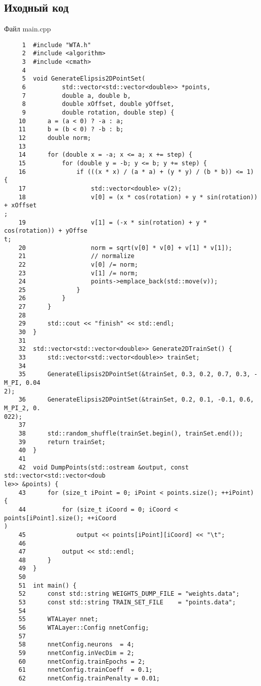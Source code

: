 \subsection{Иходный код}
Файл main.cpp
\begin{verbatim}
     1	#include "WTA.h"
     2	#include <algorithm>
     3	#include <cmath>
     4	
     5	void GenerateElipsis2DPointSet(
     6	        std::vector<std::vector<double>> *points,
     7	        double a, double b,
     8	        double xOffset, double yOffset,
     9	        double rotation, double step) {
    10	    a = (a < 0) ? -a : a;
    11	    b = (b < 0) ? -b : b;
    12	    double norm;
    13	
    14	    for (double x = -a; x <= a; x += step) {
    15	        for (double y = -b; y <= b; y += step) {
    16	            if (((x * x) / (a * a) + (y * y) / (b * b)) <= 1) {
    17	                std::vector<double> v(2);
    18	                v[0] = (x * cos(rotation) + y * sin(rotation)) + xOffset
;
    19	                v[1] = (-x * sin(rotation) + y * cos(rotation)) + yOffse
t;
    20	                norm = sqrt(v[0] * v[0] + v[1] * v[1]);
    21	                // normalize
    22	                v[0] /= norm;
    23	                v[1] /= norm;
    24	                points->emplace_back(std::move(v));
    25	            }
    26	        }
    27	    }
    28	
    29	    std::cout << "finish" << std::endl;
    30	}
    31	
    32	std::vector<std::vector<double>> Generate2DTrainSet() {
    33	    std::vector<std::vector<double>> trainSet;
    34	
    35	    GenerateElipsis2DPointSet(&trainSet, 0.3, 0.2, 0.7, 0.3, -M_PI, 0.04
2);
    36	    GenerateElipsis2DPointSet(&trainSet, 0.2, 0.1, -0.1, 0.6, M_PI_2, 0.
022);
    37	
    38	    std::random_shuffle(trainSet.begin(), trainSet.end());
    39	    return trainSet;
    40	}
    41	
    42	void DumpPoints(std::ostream &output, const std::vector<std::vector<doub
le>> &points) {
    43	    for (size_t iPoint = 0; iPoint < points.size(); ++iPoint) {
    44	        for (size_t iCoord = 0; iCoord < points[iPoint].size(); ++iCoord
)
    45	            output << points[iPoint][iCoord] << "\t";
    46	
    47	        output << std::endl;
    48	    }
    49	}
    50	
    51	int main() {
    52	    const std::string WEIGHTS_DUMP_FILE = "weights.data";
    53	    const std::string TRAIN_SET_FILE    = "points.data";
    54	    
    55	    WTALayer nnet;
    56	    WTALayer::Config nnetConfig;
    57	
    58	    nnetConfig.neurons  = 4;
    59	    nnetConfig.inVecDim = 2;
    60	    nnetConfig.trainEpochs = 2;
    61	    nnetConfig.trainCoeff  = 0.1;
    62	    nnetConfig.trainPenalty = 0.01;

\end{verbatim}
